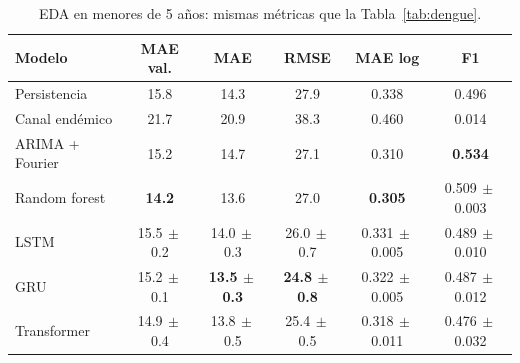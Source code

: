 \begin{table}[t]
\centering\caption{EDA en menores de 5 años: mismas métricas que la Tabla~\ref{tab:dengue}.}\label{tab:eda}
\setlength{\tabcolsep}{2.3pt}\footnotesize
\begin{tabular}{lccccc}
\toprule
Modelo & MAE val. & MAE & RMSE & MAE log & F1 \\
\midrule
Persistencia & 15.8 & 14.3 & 27.9 & 0.338 & 0.496 \\
Canal endémico & 21.7 & 20.9 & 38.3 & 0.460 & 0.014 \\
ARIMA + Fourier & 15.2 & 14.7 & 27.1 & 0.310 & \textbf{0.534} \\
Random forest & \textbf{14.2} & 13.6 & 27.0 & \textbf{0.305} & 0.509{\tiny$\,\pm$0.003} \\
\midrule
LSTM & 15.5{\tiny$\,\pm$0.2} & 14.0{\tiny$\,\pm$0.3} & 26.0{\tiny$\,\pm$0.7} & 0.331{\tiny$\,\pm$0.005} & 0.489{\tiny$\,\pm$0.010} \\
GRU & 15.2{\tiny$\,\pm$0.1} & \textbf{13.5{\tiny$\,\pm$0.3}} & \textbf{24.8{\tiny$\,\pm$0.8}} & 0.322{\tiny$\,\pm$0.005} & 0.487{\tiny$\,\pm$0.012} \\
Transformer & 14.9{\tiny$\,\pm$0.4} & 13.8{\tiny$\,\pm$0.5} & 25.4{\tiny$\,\pm$0.5} & 0.318{\tiny$\,\pm$0.011} & 0.476{\tiny$\,\pm$0.032} \\
\bottomrule
\end{tabular}
\end{table}
